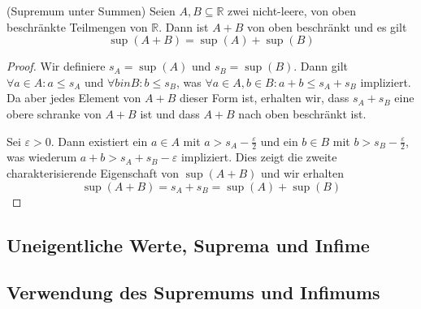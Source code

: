\documentclass[../Analysis1_script.tex]{subfiles}
\begin{document}
\begin{proposition}{(Supremum unter Summen)}
	Seien $A,B\subseteq \mathbb {R}$ zwei nicht-leere, von oben beschränkte Teilmengen von $\mathbb {R}$. Dann ist $A+B$ von oben beschränkt und es gilt 
	\[\sup(A+B) = \sup(A) + \sup(B)\]
\end{proposition}

\begin{proof}
	Wir definiere $s_A = \sup(A)$ und $s_B = \sup(B)$. Dann gilt $\forall a \in A: a \leq s_A$ und $\forall b in B: b \leq s_B$, was $\forall a \in A, b \in B: a + b \leq s_A + s_B$ impliziert. Da aber jedes Element von $A + B$ dieser Form ist, erhalten wir, dass $s_A + s_B$ eine obere schranke von $A + B$ ist und dass $A + B$ nach oben beschränkt ist.
	
	Sei $\varepsilon >0$. Dann existiert ein $a\in A$ mit $a > s_A - \frac {\varepsilon }{2}$ und ein $b\in B$ mit $b > s_B - \frac {\varepsilon }{2}$, was wiederum $a+b > s_A+s_B-\varepsilon$ impliziert. Dies zeigt die zweite charakterisierende Eigenschaft von $\sup (A+B)$ und wir erhalten 
	\[\sup(A + B) = s_A + s_B = \sup(A) + \sup(B)\]
\end{proof}


\subsection{Uneigentliche Werte, Suprema und Infime}

\subsection{Verwendung des Supremums und Infimums}
\end{document}
